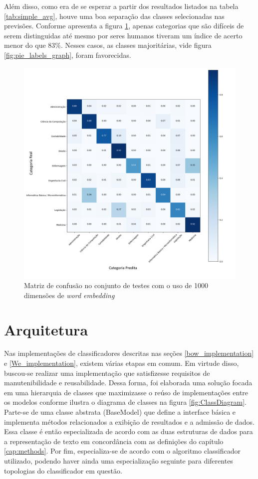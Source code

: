 Além disso, como era de se esperar a partir dos resultados listados na tabela \ref{tab:simple_avg}, houve uma boa separação das classes selecionadas nas previsões. Conforme apresenta a figura \ref{fig:confusion_matrix_1000_simpleAvg}, apenas categorias que são difíceis de serem distinguidas até mesmo por seres humanos tiveram um índice de acerto menor do que 83\%. Nesses casos, as classes majoritárias, vide figura \ref{fig:pie_labels_graph}, foram favorecidas.

\begin{figure}[!ht]
	\centering
	\includegraphics[width=1.1\textwidth]{figures/SimpleAvg_1000_Confusion_matrixnormalized.png}
	\caption{Matriz de confusão no conjunto de testes com o uso de 1000 dimensões de \textit{word embedding}}
	\label{fig:confusion_matrix_1000_simpleAvg}
\end{figure}

\section{Arquitetura }

Nas implementações de classificadores descritas nas seções \ref{bow_implementation} e \ref{We_implementation}, existem várias etapas em comum. Em virtude disso, buscou-se realizar uma implementação que satisfizesse requisitos de manutenibilidade e reusabilidade. Dessa forma, foi elaborada uma solução focada em uma hierarquia de classes que maximizasse o reúso de implementações entre os modelos conforme ilustra o diagrama de classes na figura \ref{fig:ClassDiagram}. Parte-se de uma classe abstrata (BaseModel) que define a interface básica e implementa métodos relacionados a exibição de resultados e a admissão de dados. Essa classe é então especializada de acordo com as duas estruturas de dados para a representação de texto em concordância com as definições do capítulo \ref{cap:methods}. Por fim, especializa-se de acordo com o algoritmo classificador utilizado, podendo haver ainda uma especialização seguinte para diferentes topologias do classificador em questão.

